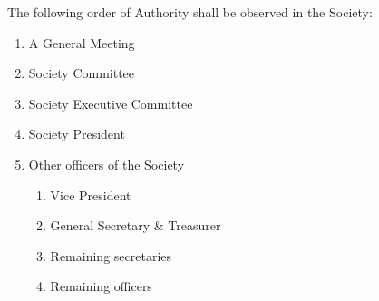 \begin{clause}
	The following order of Authority shall be observed in the Society:
	\begin{enumerate}
		\item A General Meeting
		\item Society Committee
		\item Society Executive Committee
		\item Society President
		\item Other officers of the Society
		\begin{enumerate}
			\item Vice President
			\item General Secretary \& Treasurer
			\item Remaining secretaries
			\item Remaining officers
		\end{enumerate}
	\end{enumerate}
\end{clause}